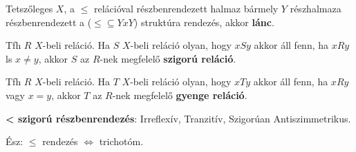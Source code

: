 \begin{frame}
\begin{tcolorbox}[title={Def.: Szigorú, gyenge reláció, Lánc}]
Tetszőleges $X$, a $\leq$ relációval részbenrendezett halmaz bármely $Y$ részhalmaza részbenrendezett a ($\leq \subseteq Y x Y$) struktúra rendezés, akkor \textbf{lánc}.\\
\mmedskip

Tfh $R$ $X$-beli reláció. Ha $S$ $X$-beli reláció olyan, hogy $xSy$ akkor áll fenn, ha $xRy$ ls $x \neq y$, akkor $S$ az $R$-nek megfelelő \textbf{szigorú reláció}.\\
\mmedskip

Tfh $R$ $X$-beli reláció. Ha $T$ $X$-beli reláció olyan, hogy $xTy$ akkor áll fenn, ha $xRy$ vagy $x = y$, akkor $T$ az $R$-nek megfelelő \textbf{gyenge reláció}.\\
\mmedskip

\textbf{< szigorú részbenrendezés}: Irreflexív, Tranzitív, Szigorúan Antiszimmetrikus.\\
\mmedskip

Ész: $\leq$ rendezés $\iff$ trichotóm.
\end{tcolorbox}
\end{frame}


